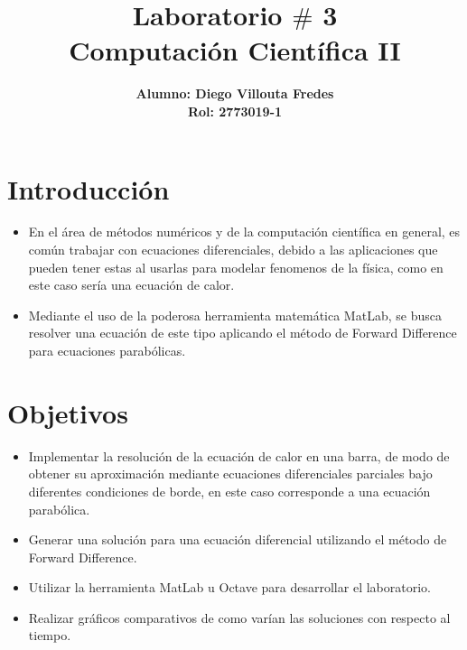 \documentclass[letter, 10pt]{article}
\title{Laboratorio $\#$ 3\\
       Computaci\'on Cient\'ifica II\\}
\author{\bf Alumno: Diego Villouta Fredes\\
\bf Rol: 2773019-1}
\begin{document}
\begin{titlepage}
\maketitle
\thispagestyle{empty}
\end{titlepage}

\tableofcontents

\newpage

\section{ Introducci\'on }

\begin{itemize}
\item En el \'area de m\'etodos num\'ericos y de la computaci\'on cient\'ifica en general, es com\'un trabajar con ecuaciones diferenciales, debido a las aplicaciones que pueden tener estas al usarlas para modelar fenomenos de la f\'isica, como en este caso ser\'ia una ecuaci\'on de calor.\\
\item Mediante el uso de la poderosa herramienta matem\'atica MatLab, se busca resolver una ecuaci\'on de este tipo aplicando el m\'etodo de Forward Difference para ecuaciones parab\'olicas.\\
\end{itemize}

\section{ Objetivos }

\begin{itemize}
\item Implementar la resoluci\'on de la ecuaci\'on de calor en una barra, de modo de obtener su aproximaci\'on mediante ecuaciones diferenciales parciales bajo diferentes condiciones de borde, en este caso corresponde a una ecuaci\'on parab\'olica.\\
\item Generar una soluci\'on para una ecuaci\'on diferencial utilizando el m\'etodo de Forward Difference.\\
\item Utilizar la herramienta MatLab u Octave para desarrollar el laboratorio.\\
\item Realizar gr\'aficos comparativos de como var\'ian las soluciones con respecto al tiempo.
\end{itemize}
\end{document}
